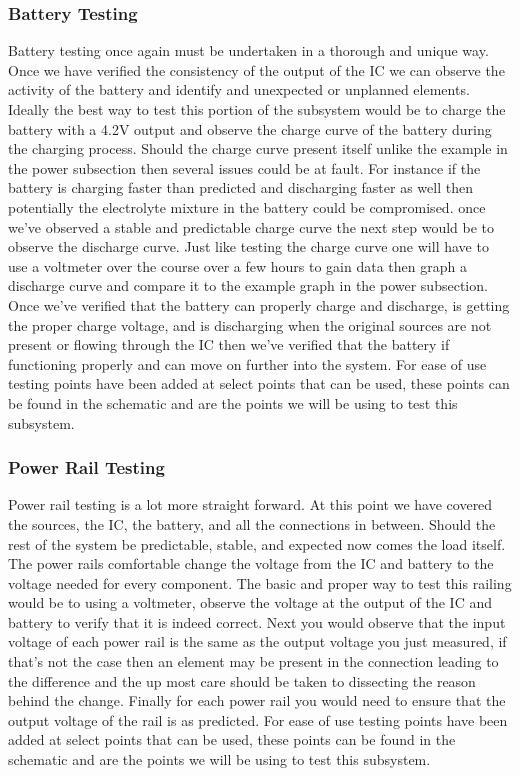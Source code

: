 \subsubsection{Battery Testing}
Battery testing once again must be undertaken in a thorough and unique way. Once we have verified the consistency of the output of the IC we can observe the activity of the battery and identify and unexpected or unplanned elements. Ideally the best way to test this portion of the subsystem would be to charge the battery with a 4.2V output and observe the charge curve of the battery during the charging process. Should the charge curve present itself unlike the example in the power subsection then several issues could be at fault. For instance if the battery is charging faster than predicted and discharging faster as well then potentially the electrolyte mixture in the battery could be compromised. once we've observed a stable and predictable charge curve the next step would be to observe the discharge curve. Just like testing the charge curve one will have to use a voltmeter over the course over a few hours to gain data then graph a discharge curve and compare it to the example graph in the power subsection. Once we've verified that the battery can properly charge and discharge, is getting the proper charge voltage, and is discharging when the original sources are not present or flowing through the IC then we've verified that the battery if functioning properly and can move on further into the system. For ease of use testing points have been added at select points that can be used, these points can be found in the schematic and are the points we will be using to test this subsystem.

\subsubsection{Power Rail Testing}
Power rail testing is a lot more straight forward. At this point we have covered the sources, the IC, the battery, and all the connections in between. Should the rest of the system be predictable, stable, and expected now comes the load itself. The power rails comfortable change the voltage from the IC and battery to the voltage needed for every component. The basic and proper way to test this railing would be to using a voltmeter, observe the voltage at the output of the IC and battery to verify that it is indeed correct. Next you would observe that the input voltage of each power rail is the same as the output voltage you just measured, if that's not the case then an element may be present in the connection leading to the difference and the up most care should be taken to dissecting the reason behind the change. Finally for each power rail you would need to ensure that the output voltage of the rail is as predicted. For ease of use testing points have been added at select points that can be used, these points can be found in the schematic and are the points we will be using to test this subsystem.
